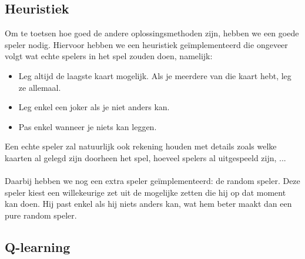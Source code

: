 \documentclass[11pt]{article}
\begin{document}
\subsection{Heuristiek}
Om te toetsen hoe goed de andere oplossingsmethoden zijn, hebben we een goede speler nodig. Hiervoor hebben we een heuristiek geïmplementeerd die ongeveer volgt wat echte spelers in het spel zouden doen, namelijk:
\begin{itemize}
	\item Leg altijd de laagste kaart mogelijk. Als je meerdere van die kaart hebt, leg ze allemaal.
	\item Leg enkel een joker als je niet anders kan.
	\item Pas enkel wanneer je niets kan leggen.
\end{itemize}
Een echte speler zal natuurlijk ook rekening houden met details zoals welke kaarten al gelegd zijn doorheen het spel, hoeveel spelers al uitgespeeld zijn, ... \\\\
Daarbij hebben we nog een extra speler geïmplementeerd: de random speler. Deze speler kiest een willekeurige zet uit de mogelijke zetten die hij op dat moment kan doen. Hij past enkel als hij niets anders kan, wat hem beter maakt dan een pure random speler.

\subsection{Q-learning}
\end{document}
